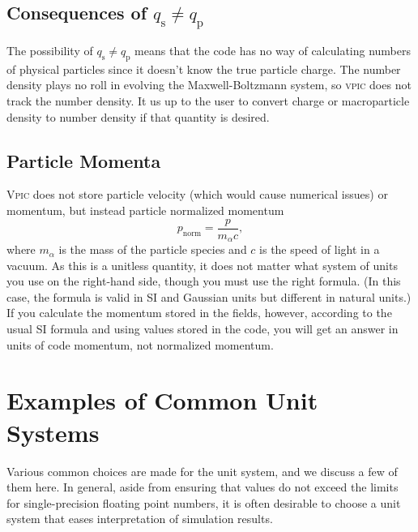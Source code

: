 \documentclass[twocolumn,10pt]{article}
\begin{document}
	\subsection{Consequences of $q_{\mathrm{s}} \neq q_{\mathrm{p}}$}

	The possibility of $q_{\mathrm{s}} \neq q_{\mathrm{p}}$ means that the code has no way of calculating numbers of physical particles since it doesn't know the true particle charge. %
    The number density plays no roll in evolving the Maxwell-Boltzmann system, so \textsc{vpic} does not track the number density.
    It us up to the user to convert charge or macroparticle density to number density if that quantity is desired.

	\subsection{Particle Momenta}
    \textsc{Vpic} does not store particle velocity (which would cause numerical issues) or momentum, but instead particle normalized momentum
\begin{equation}
    p_{\textrm{norm}} = \frac{p}{m_\alpha c},
\end{equation}
where $m_\alpha$ is the mass of the particle species and $c$ is the speed of light in a vacuum.
As this is a unitless quantity, it does not matter what system of units you use on the right-hand side, though you must use the right formula.
(In this case, the formula is valid in SI and Gaussian units but different in natural units.)
If you calculate the momentum stored in the fields, however, according to the usual SI formula and using values stored in the code, you will get an answer in units of code momentum, not normalized momentum.

	\section{Examples of Common Unit Systems}

	Various common choices are made for the unit system, and we discuss a few of them here. In general, aside from ensuring that values do not exceed the limits for single-precision floating point numbers, it is often desirable to choose a unit system that eases interpretation of simulation results.
\end{document}
